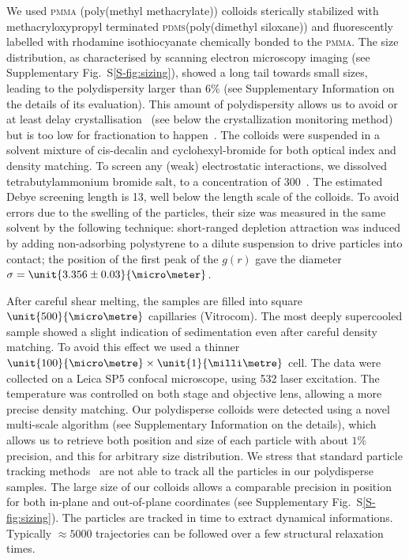 We used \textsc{pmma} (poly(methyl methacrylate)) colloids sterically stabilized with methacryloxypropyl terminated \textsc{pdms}(poly(dimethyl siloxane)) and fluorescently labelled with rhodamine isothiocyanate chemically bonded to the \textsc{pmma}. The size distribution, as characterised by scanning electron microscopy imaging (see Supplementary Fig.~S\ref{S-fig:sizing}), showed a long tail towards small sizes, leading to the polydispersity larger than 6\% (see Supplementary Information on the details of its evaluation). This amount of polydispersity allows us to avoid or at least delay crystallisation~\cite{Zaccarelli2009} (see below the crystallization monitoring method) but is too low for fractionation to happen~\citep{Fasolo2003}. The colloids were suspended in a solvent mixture of cis-decalin and cyclohexyl-bromide for both optical index and density matching. To screen any (weak) electrostatic interactions, we dissolved tetrabutylammonium bromide salt, to a concentration of \unit{300}{\nano\mole\per\liter}~\citep{royall2005}. The estimated Debye screening length is \unit{13}{\nano\metre}, well below the length scale of the colloids. To avoid errors due to the swelling of the particles, their size was measured in the same solvent by the following technique: short-ranged depletion attraction was induced by adding non-adsorbing polystyrene to a dilute suspension to drive particles into contact; the position of the first peak of the $g(r)$ gave the diameter $\sigma = \unit{3.356\pm0.03}{\micro\meter}$.

After careful shear melting, the samples are filled into square $\unit{500}{\micro\metre}$ capillaries (Vitrocom). The most deeply supercooled sample showed a slight indication of sedimentation even after careful density matching. To avoid this effect we used a thinner $\unit{100}{\micro\metre}\times\unit{1}{\milli\metre}$ cell. The data were collected on a Leica SP5 confocal microscope, using \unit{532}{\nano\meter} laser excitation. The temperature was controlled on both stage and objective lens, allowing a more precise density matching. Our polydisperse colloids were detected using a novel multi-scale algorithm (see Supplementary Information on the details), which allows us to retrieve both position and size of each particle with about $1\%$ precision, and this for arbitrary size distribution. We stress that standard particle tracking methods~\cite{kegel2000swe, weeks2000} are not able to track all the particles in our polydisperse samples. The large size of our colloids allows a comparable precision in position for both in-plane and out-of-plane coordinates (see Supplementary Fig.~S\ref{S-fig:sizing}). The particles are tracked in time to extract dynamical informations. Typically $\approx 5000$ trajectories can be followed over a few structural relaxation times.

